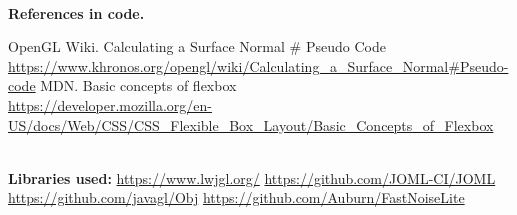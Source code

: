 \documentclass{article}
\begin{document}
\begin{thebibliography}{9}
        \textbf{\\ References in code.}

         OpenGL Wiki. Calculating a Surface Normal \# Pseudo Code \\
        \url{https://www.khronos.org/opengl/wiki/Calculating_a_Surface_Normal#Pseudo-code}
         MDN. Basic concepts of flexbox \\
        \url{https://developer.mozilla.org/en-US/docs/Web/CSS/CSS_Flexible_Box_Layout/Basic_Concepts_of_Flexbox}

        \textbf{\\ Libraries used:}
         \url{https://www.lwjgl.org/}
         \url{https://github.com/JOML-CI/JOML}
         \url{https://github.com/javagl/Obj}
         \url{https://github.com/Auburn/FastNoiseLite}


\end{thebibliography}
\end{document}
